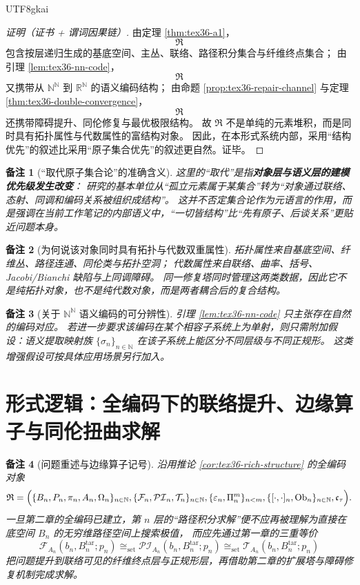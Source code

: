 \documentclass[12pt]{article}
\newtheorem{remark}{备注}[section]
\newcommand{\NN}{\mathbb{N}}
\newcommand{\RR}{\mathbb{R}}
\newcommand{\Ob}{\operatorname{Ob}}
\begin{document}
\begin{CJK*}{UTF8}{gkai}
\begin{proof}[证明（证书 + 谓词因果链）]
由定理 \ref{thm:tex36-a1}，
\[
  \mathfrak R
\]
包含按层递归生成的基底空间、主丛、联络、路径积分集合与纤维终点集合；
由引理 \ref{lem:tex36-nn-code}，
\[
  \mathfrak R
\]
又携带从 $\NN^\NN$ 到 $\RR^\NN$ 的语义编码结构；
由命题 \ref{prop:tex36-repair-channel} 与定理 \ref{thm:tex36-double-convergence}，
\[
  \mathfrak R
\]
还携带障碍提升、同伦修复与最优极限结构。
故 $\mathfrak R$ 不是单纯的元素堆积，而是同时具有拓扑属性与代数属性的富结构对象。
因此，在本形式系统内部，采用“结构优先”的叙述比采用“原子集合优先”的叙述更自然。证毕。
\end{proof}

\begin{remark}[“取代原子集合论”的准确含义]
这里的“取代”是指\textbf{对象层与语义层的建模优先级发生改变}：
研究的基本单位从“孤立元素属于某集合”转为“对象通过联络、态射、同调和编码关系被组织成结构”。
这并不否定集合论作为元语言的作用，而是强调在当前工作笔记的内部语义中，“一切皆结构”比“先有原子、后谈关系”更贴近问题本身。
\end{remark}

\begin{remark}[为何说该对象同时具有拓扑与代数双重属性]
拓扑属性来自基底空间、纤维丛、路径连通、同伦类与拓扑空洞；
代数属性来自联络、曲率、括号、Jacobi/Bianchi 缺陷与上同调障碍。
同一修复塔同时管理这两类数据，因此它不是纯拓扑对象，也不是纯代数对象，而是两者耦合后的复合结构。
\end{remark}

\begin{remark}[关于 $\NN^\NN$ 语义编码的可分辨性]
引理 \ref{lem:tex36-nn-code} 只主张存在自然的编码对应。
若进一步要求该编码在某个相容子系统上为单射，则只需附加假设：语义提取映射族 $\{\sigma_n\}_{n\in\NN}$ 在该子系统上能区分不同层级与不同正规形。
这类增强假设可按具体应用场景另行加入。
\end{remark}

\clearpage
\section{形式逻辑：全编码下的联络提升、边缘算子与同伦扭曲求解}
\label{sec:tex36-ch3}

\begin{remark}[问题重述与边缘算子记号]
沿用推论 \ref{cor:tex36-rich-structure} 的全编码对象
\[
  \mathfrak R
  =
  \Bigl(
    \{B_n,P_n,\pi_n,A_n,\Omega_n\}_{n\in\NN},
    \{\mathcal{F}_n,\mathcal{PI}_n,\mathcal{T}_n\}_{n\in\NN},
    \{\varepsilon_n,\Pi_n^m\}_{n<m},
    \{[\cdot,\cdot]_n,\Ob_n\}_{n\in\NN},
    \mathfrak c_{\tau}
  \Bigr).
\]
一旦第二章的全编码已建立，第 $n$ 层的“路径积分求解”便不应再被理解为直接在底空间 $B_n$ 的无穷维路径空间上搜索极值，
而应先通过第一章的三重等价
\[
  \mathcal{F}_{A_n}(b_n,B_n^{\mathrm{tar}};p_n)
  \cong_{\mathrm{set}}
  \mathcal{PI}_{A_n}(b_n,B_n^{\mathrm{tar}};p_n)
  \cong_{\mathrm{set}}
  \mathcal{T}_{A_n}(b_n,B_n^{\mathrm{tar}};p_n)
\]
把问题提升到联络可见的纤维终点层与正规形层，再借助第二章的扩展塔与障碍修复机制完成求解。


\end{remark}
\end{CJK*}
\end{document}
